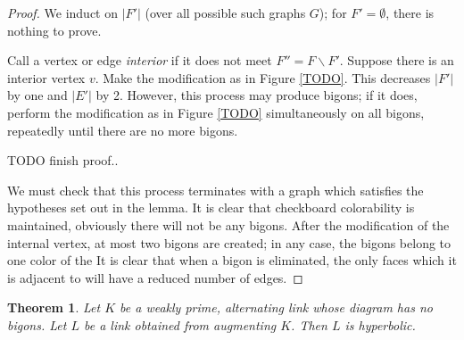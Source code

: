 \documentclass[11pt]{amsart}
\newcommand{\figref}[1]{Figure \ref{#1}}
\theoremstyle{plain}
\newtheorem{theorem}{Theorem}[section]
\theoremstyle{definition}
\begin{document}
\begin{proof}
We induct on $|F'|$ (over all possible such graphs $G$);
for $F' = \emptyset$, there is nothing to prove.

Call a vertex or edge \emph{interior} if it does not meet
$F'' = F \backslash F'$.
Suppose there is an interior vertex $v$.
Make the modification as in \figref{TODO}.
This decreases $|F'|$ by one and $|E'|$ by 2.
However, this process may produce bigons;
if it does, perform the modification as in \figref{TODO}
simultaneously on all bigons,
repeatedly until there are no more bigons.


TODO finish proof..

We must check that this process terminates with a graph
which satisfies the hypotheses set out in the lemma.
It is clear that checkboard colorability is maintained,
obviously there will not be any bigons.
After the modification of the internal vertex,
at most two bigons are created;
in any case, the bigons belong to one color of the 
It is clear that when a bigon is eliminated,
the only faces which it is adjacent to will have a reduced number of edges.
\end{proof}



\begin{theorem}
Let $K$ be a weakly prime, alternating link whose diagram has no bigons.
Let $L$ be a link obtained from augmenting $K$.
Then $L$ is hyperbolic.
\end{theorem}
\end{document}

